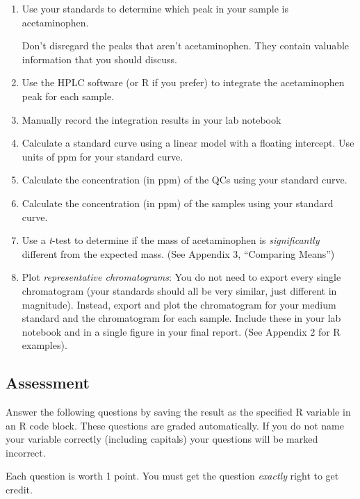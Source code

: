 \documentclass[]{tufte-book}
\providecommand{\tightlist}{%
  \setlength{\itemsep}{0pt}\setlength{\parskip}{0pt}}
\begin{document}
\begin{enumerate}
\def\labelenumi{\arabic{enumi}.}
\tightlist
\item
  Use your standards to determine which peak in your sample is acetaminophen.

  \begin{marginfigure}
    Don't disregard the peaks that aren't acetaminophen. They contain
    valuable information that you should discuss.
    \end{marginfigure}
\item
  Use the HPLC software (or R if you prefer) to integrate the acetaminophen peak for each sample.
\item
  Manually record the integration results in your lab notebook
\item
  Calculate a standard curve using a linear model with a floating intercept. Use units of ppm for your standard curve.
\item
  Calculate the concentration (in ppm) of the QCs using your standard curve.
\item
  Calculate the concentration (in ppm) of the samples using your standard curve.
\item
  Use a \emph{t}-test to determine if the mass of acetaminophen is \emph{significantly} different from the expected mass. (See Appendix 3, ``Comparing Means'')
\item
  Plot \emph{representative chromatograms}: You do not need to export every single chromatogram (your standards should all be very similar, just different in magnitude). Instead, export and plot the chromatogram for your medium standard and the chromatogram for each sample. Include these in your lab notebook and in a single figure in your final report. (See Appendix 2 for R examples).
\end{enumerate}

\hypertarget{am-hplc-assessment}{%
\subsection{Assessment}\label{am-hplc-assessment}}

Answer the following questions by saving the result as the specified R variable in an R code block. These questions are graded automatically. If you do not name your variable correctly (including capitals) your questions will be marked incorrect.

Each question is worth 1 point. You must get the question \emph{exactly} right to get credit.
\end{document}
